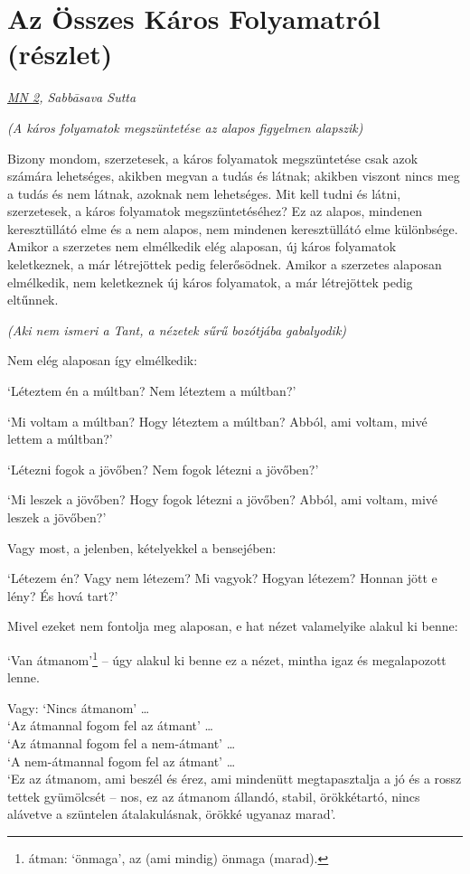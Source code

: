 \clearpage

\section{Az Összes Káros Folyamatról (részlet)}

{\centering
\emph{\href{https://a-buddha-ujja.hu/mn-2/hu/forizs-laszlo}{MN 2}, Sabbāsava Sutta}
\par}

{
\setlength{\parindent}{0pt}\setlength{\parskip}{5pt}
\fontsize{9.5}{14}\selectfont

\emph{(A káros folyamatok megszüntetése az alapos figyelmen alapszik)}

Bizony mondom, szerzetesek, a káros folyamatok megszüntetése csak azok számára
lehetséges, akikben megvan a tudás és látnak; akikben viszont nincs meg a tudás
és nem látnak, azoknak nem lehetséges. Mit kell tudni és látni, szerzetesek, a
káros folyamatok megszüntetéséhez? Ez az alapos, mindenen keresztüllátó elme és
a nem alapos, nem mindenen keresztüllátó elme különbsége. Amikor a szerzetes nem
elmélkedik elég alaposan, új káros folyamatok keletkeznek, a már létrejöttek
pedig felerősödnek. Amikor a szerzetes alaposan elmélkedik, nem keletkeznek új
káros folyamatok, a már létrejöttek pedig eltűnnek.

\emph{(Aki nem ismeri a Tant, a nézetek sűrű bozótjába gabalyodik)}

Nem elég alaposan így elmélkedik:

`Léteztem én a múltban? Nem léteztem a múltban?'

`Mi voltam a múltban? Hogy léteztem a múltban? Abból, ami voltam, mivé lettem a múltban?'

`Létezni fogok a jövőben? Nem fogok létezni a jövőben?'

`Mi leszek a jövőben? Hogy fogok létezni a jövőben? Abból, ami voltam, mivé leszek a jövőben?'

Vagy most, a jelenben, kételyekkel a bensejében:

`Létezem én? Vagy nem létezem? Mi vagyok? Hogyan létezem? Honnan jött e lény? És hová tart?'

Mivel ezeket nem fontolja meg alaposan, e hat nézet valamelyike alakul ki benne:

`Van átmanom'\footnote{átman: `önmaga', az (ami mindig) önmaga (marad).} -- úgy alakul ki benne ez a nézet, mintha igaz és megalapozott lenne.

Vagy:
`Nincs átmanom' \ldots{}\\
`Az átmannal fogom fel az átmant' \ldots{}\\
`Az átmannal fogom fel a nem-átmant' \ldots{}\\
`A nem-átmannal fogom fel az átmant' \ldots{}\\
`Ez az átmanom, ami beszél és érez, ami mindenütt megtapasztalja a jó és a rossz tettek gyümölcsét – nos, ez az átmanom állandó, stabil, örökkétartó, nincs alávetve a szüntelen átalakulásnak, örökké ugyanaz marad'.

}
